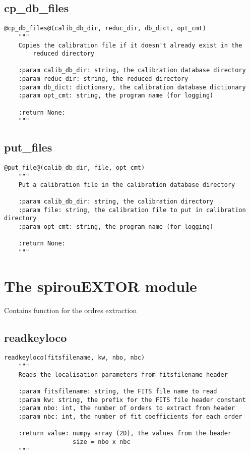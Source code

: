 \vspace{0.5cm}
\subsection{cp\_db\_files}
\begin{lstlisting}[style=pythonstyle]
@cp_db_files@(calib_db_dir, reduc_dir, db_dict, opt_cmt)
    """
    Copies the calibration file if it doesn't already exist in the
        reduced directory

    :param calib_db_dir: string, the calibration database directory
    :param reduc_dir: string, the reduced directory
    :param db_dict: dictionary, the calibration database dictionary
    :param opt_cmt: string, the program name (for logging)

    :return None:
    """
\end{lstlisting}

\vspace{0.5cm}
\subsection{put\_files}
\begin{lstlisting}[style=pythonstyle]
@put_file@(calib_db_dir, file, opt_cmt)
    """
    Put a calibration file in the calibration database directory
    
    :param calib_db_dir: string, the calibration directory 
    :param file: string, the calibration file to put in calibration directory
    :param opt_cmt: string, the program name (for logging)
    
    :return None: 
    """
\end{lstlisting}

\clearpage
\newpage
\section{The spirouEXTOR module}

Contains function for the ordres extraction

\subsection{readkeyloco}
\begin{lstlisting}[style=pythonstyle]
readkeyloco(fitsfilename, kw, nbo, nbc)
    """
    Reads the localisation parameters from fitsfilename header

    :param fitsfilename: string, the FITS file name to read
    :param kw: string, the prefix for the FITS file header constant
    :param nbo: int, the number of orders to extract from header
    :param nbc: int, the number of fit coefficients for each order
   
    :return value: numpy array (2D), the values from the header
                   size = nbo x nbc
    """
\end{lstlisting}

